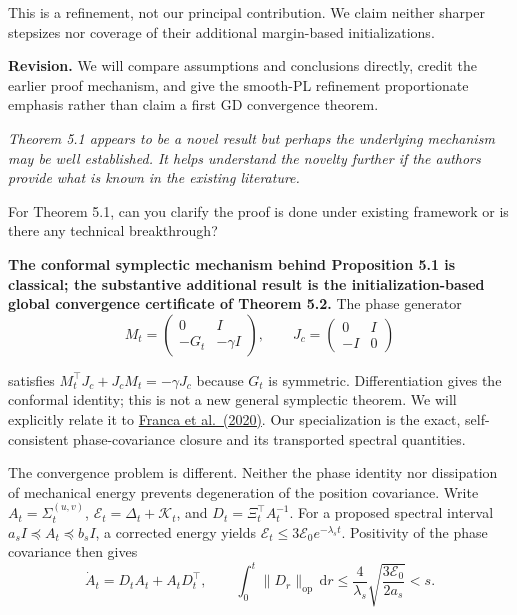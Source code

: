 \documentclass[11pt,a4paper]{article}
\renewenvironment{quote}
  {\par\addvspace{0.8em}\Needspace{8\baselineskip}%
    \list{}{\leftmargin=1.2em\rightmargin=0pt\topsep=0.25em
    \parsep=0.3em}\item\relax\normalsize\itshape\color{quotegray}}
  {\endlist\nopagebreak[4]}
\begin{document}
This is a refinement, not our principal contribution. We claim neither sharper stepsizes nor coverage of their additional margin-based initializations.

\textbf{Revision.} We will compare assumptions and conclusions directly, credit the earlier proof mechanism, and give the smooth-PL refinement proportionate emphasis rather than claim a first GD convergence theorem.

\begin{quote}
Theorem 5.1 appears to be a novel result but perhaps the underlying mechanism may be well established. It helps understand the novelty further if the authors provide what is known in the existing literature.

For Theorem 5.1, can you clarify the proof is done under existing framework or is there any technical breakthrough?
\end{quote}

\textbf{The conformal symplectic mechanism behind Proposition 5.1 is classical; the substantive additional result is the initialization-based global convergence certificate of Theorem 5.2.} The phase generator
\[
M_t=\begin{pmatrix}0&I\\-G_t&-\gamma I\end{pmatrix},\qquad
J_c=\begin{pmatrix}0&I\\-I&0\end{pmatrix}
\]

satisfies \(M_t^\top J_c+J_cM_t=-\gamma J_c\) because \(G_t\) is symmetric. Differentiation gives the conformal identity; this is not a new general symplectic theorem. We will explicitly relate it to \href{https://proceedings.neurips.cc/paper/2020/file/c4b108f53550f1d5967305a9a8140ddd-Paper.pdf}{Franca et al.~(2020)}. Our specialization is the exact, self-consistent phase-covariance closure and its transported spectral quantities.

The convergence problem is different. Neither the phase identity nor dissipation of mechanical energy prevents degeneration of the position covariance. Write \(A_t=\Sigma_t^{(u,v)}\), \(\mathcal E_t=\Delta_t+\mathcal K_t\), and \(D_t=\Xi_t^\top A_t^{-1}\). For a proposed spectral interval \(a_s I\preceq A_t\preceq b_s I\), a corrected energy yields \(\mathcal E_t\le3\mathcal E_0e^{-\lambda_s t}\). Positivity of the phase covariance then gives
\[
\dot A_t=D_tA_t+A_tD_t^\top,\qquad
\int_0^t\|D_r\|_{\mathrm{op}}\,\mathrm dr
\le\frac4{\lambda_s}\sqrt{\frac{3\mathcal E_0}{2a_s}}<s.
\]
\end{document}
